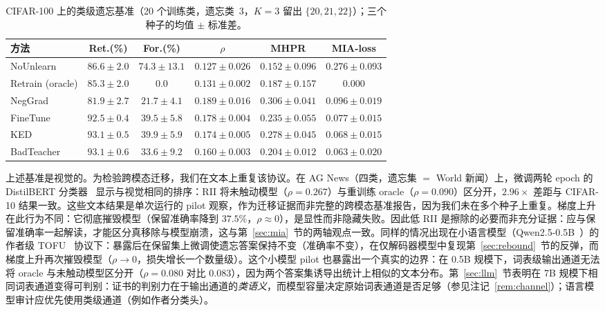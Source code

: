 \begin{table}[t]
\centering
\small
\caption{CIFAR-100 上的类级遗忘基准（20 个训练类，遗忘类~3，$K{=}3$ 留出 $\{20,21,22\}$）；三个种子的均值 $\pm$ 标准差。}\label{tab:cifar100}
\setlength{\tabcolsep}{2pt}
\begin{tabular}{l c c c c c}
\toprule
方法 & Ret.(\%) & For.(\%) & $\rho$ & MHPR & MIA-loss \\
\midrule
NoUnlearn & $86.6{\pm}2.0$ & $74.3{\pm}13.1$ & $0.127{\pm}0.026$ & $0.152{\pm}0.096$ & $0.276{\pm}0.093$ \\
Retrain (oracle) & $85.3{\pm}2.0$ & 0.0 & $0.131{\pm}0.002$ & $0.187{\pm}0.157$ & 0.000 \\
NegGrad & $81.9{\pm}2.7$ & $21.7{\pm}4.1$ & $\mathbf{0.189{\pm}0.016}$ & $0.306{\pm}0.041$ & $0.096{\pm}0.019$ \\
FineTune & $92.5{\pm}0.4$ & $39.5{\pm}5.8$ & $0.178{\pm}0.004$ & $0.235{\pm}0.055$ & $0.077{\pm}0.015$ \\
KED & $93.1{\pm}0.5$ & $39.9{\pm}5.9$ & $0.174{\pm}0.005$ & $0.278{\pm}0.045$ & $0.068{\pm}0.015$ \\
BadTeacher & $93.1{\pm}0.6$ & $33.6{\pm}9.2$ & $0.160{\pm}0.003$ & $0.204{\pm}0.012$ & $0.063{\pm}0.020$ \\
\bottomrule
\end{tabular}
\end{table}

上述基准是视觉的。为检验跨模态迁移，我们在文本上重复该协议。在 AG News（四类，遗忘集 $=$ World 新闻）上，微调两轮 epoch 的 DistilBERT 分类器~\cite{sanh2020distilbert} 显示与视觉相同的排序：RII 将未触动模型（$\rho{=}0.267$）与重训练 oracle（$\rho{=}0.090$）区分开，$2.96{\times}$ 差距与 CIFAR-10 结果一致。这些文本结果是单次运行的 pilot 观察，作为迁移证据而非完整的跨模态基准报告，因为我们未在多个种子上重复。梯度上升在此行为不同：它彻底摧毁模型（保留准确率降到 $37.5\%$，$\rho{\approx}0$），是显性而非隐藏失败。因此低 RII 是擦除的必要而非充分证据：应与保留准确率一起解读，才能区分真移除与模型崩溃，这与第~\ref{sec:mia}~节的两轴观点一致。同样的情况出现在小语言模型（Qwen2.5-0.5B~\cite{qwen2024qwen2}）的作者级 TOFU~\cite{maini2024tofu} 协议下：暴露后在保留集上微调使遗忘答案保持不变（准确率不变），在仅解码器模型中复现第~\ref{sec:rebound}~节的反弹，而梯度上升再次摧毁模型（$\rho{\to}0$，损失增长一个数量级）。这个小模型 pilot 也暴露出一个真实的边界：在 0.5B 规模下，词表级输出通道无法将 oracle 与未触动模型区分开（$\rho{=}0.080$ 对比 $0.083$），因为两个答案集诱导出统计上相似的文本分布。第~\ref{sec:llm}~节表明在 7B 规模下相同词表通道变得可判别：证书的判别力在于输出通道的\emph{类语义}，而模型容量决定原始词表通道是否足够（参见注记~\ref{rem:channel}）；语言模型审计应优先使用类级通道（例如作者分类头）。

